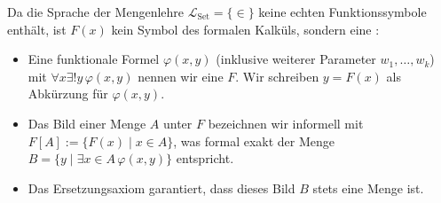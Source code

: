 \begin{math-stroke}
\begin{axioms}
\end{axioms}

\begin{explanation-of-steps}
Da die Sprache der Mengenlehre $\mathcal{L}_{\text{Set}} = \{\in\}$ keine echten Funktionssymbole enthält, ist $F(x)$ kein Symbol des formalen Kalküls, sondern eine :
\begin{itemize}
    \item Eine funktionale Formel $\varphi(x, y)$ (inklusive weiterer Parameter $w_1, \dots, w_k$) mit $\forall x \exists! y \, \varphi(x, y)$ nennen wir eine  $F$. Wir schreiben $y = F(x)$ als Abkürzung für $\varphi(x, y)$.
    \item Das Bild einer Menge $A$ unter $F$ bezeichnen wir informell mit $F[A] := \{ F(x) \mid x \in A \}$, was formal exakt der Menge $B = \{ y \mid \exists x \in A \, \varphi(x, y) \}$ entspricht.
    \item Das Ersetzungsaxiom garantiert, dass dieses Bild $B$ stets eine Menge ist.
\end{itemize}
\end{explanation-of-steps}
\end{math-stroke}

